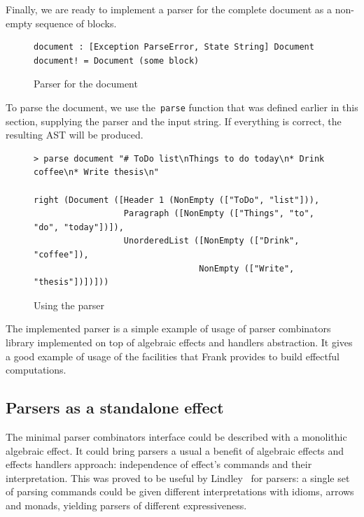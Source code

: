       Finally, we are ready to implement a parser for the complete document as a
      non-empty sequence of blocks.

      \begin{figure}[h]
      \begin{lstlisting}
document : [Exception ParseError, State String] Document
document! = Document (some block)
      \end{lstlisting}
      \caption{Parser for the document}
      \label{listing:parserMdDocCombo}
      \end{figure}

      To parse the document, we use the~\texttt{parse} function that was defined earlier
      in this section, supplying the parser and the input string. If everything is
      correct, the resulting AST will be produced.


      \begin{figure}[h]
      \begin{lstlisting}
> parse document "# ToDo list\nThings to do today\n* Drink coffee\n* Write thesis\n"

right (Document ([Header 1 (NonEmpty (["ToDo", "list"])),
                  Paragraph ([NonEmpty (["Things", "to", "do", "today"])]),
                  UnorderedList ([NonEmpty (["Drink", "coffee"]),
                                 NonEmpty (["Write", "thesis"])])]))
      \end{lstlisting}
      \caption{Using the parser}
      \label{listing:parserExprMainCombo}
      \end{figure}

      The implemented parser is a simple example of usage of parser combinators library
      implemented on top of algebraic effects and handlers abstraction. It gives a
      good example of usage of the facilities that Frank provides to build
      effectful computations.

  \subsection{Parsers as a standalone effect}

    The minimal parser combinators interface could be described with a monolithic
    algebraic effect. It could bring parsers a usual a benefit of algebraic effects
    and effects handlers approach: independence of effect's commands and their interpretation.
    This was proved to be useful by Lindley~\cite{Lindley:2014:AEE:2633628.2633636}
    for parsers: a single set of parsing commands could be given different interpretations
    with idioms, arrows and monads, yielding parsers of different expressiveness.


